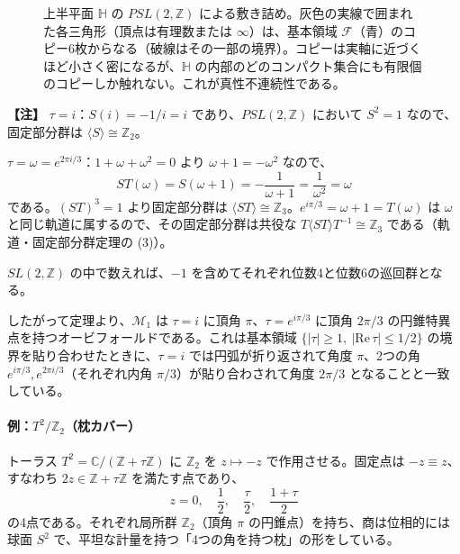 \documentclass[uplatex, dvipdfmx, book]{jsbook}
\newenvironment{note}{\vspace{1ex}\par\footnotesize\noindent\textbf{【注】}}{\par\vspace{1ex}}
\begin{document}
\begin{figure}[htbp]
\caption{上半平面 $\mathbb{H}$ の $PSL(2,\mathbb{Z})$ による敷き詰め。灰色の実線で囲まれた各三角形（頂点は有理数または $\infty$）は、基本領域 $\mathcal{F}$（青）のコピー6枚からなる（破線はその一部の境界）。コピーは実軸に近づくほど小さく密になるが、$\mathbb{H}$ の内部のどのコンパクト集合にも有限個のコピーしか触れない。これが真性不連続性である。}
\label{fig:tessellation}
\end{figure}

\begin{note}
$\tau = i$：$S(i) = -1/i = i$ であり、$PSL(2, \mathbb{Z})$ において $S^2 = 1$ なので、固定部分群は $\langle S \rangle \cong \mathbb{Z}_2$。

$\tau = \omega = e^{2\pi i/3}$：$1 + \omega + \omega^2 = 0$ より $\omega + 1 = -\omega^2$ なので、
\begin{equation*}
    ST(\omega) = S(\omega + 1) = -\frac{1}{\omega + 1} = \frac{1}{\omega^2} = \omega
\end{equation*}
である。$(ST)^3 = 1$ より固定部分群は $\langle ST \rangle \cong \mathbb{Z}_3$。$e^{i\pi/3} = \omega + 1 = T(\omega)$ は $\omega$ と同じ軌道に属するので、その固定部分群は共役な $T \langle ST \rangle T^{-1} \cong \mathbb{Z}_3$ である（軌道・固定部分群定理の (3)）。

$SL(2, \mathbb{Z})$ の中で数えれば、$-1$ を含めてそれぞれ位数4と位数6の巡回群となる。
\end{note}

したがって定理より、$\mathcal{M}_1$ は $\tau = i$ に頂角 $\pi$、$\tau = e^{i\pi/3}$ に頂角 $2\pi/3$ の円錐特異点を持つオービフォールドである。これは基本領域 $\{|\tau| \ge 1,\ |\mathrm{Re}\,\tau| \le 1/2\}$ の境界を貼り合わせたときに、$\tau = i$ では円弧が折り返されて角度 $\pi$、2つの角 $e^{i\pi/3}, e^{2\pi i/3}$（それぞれ内角 $\pi/3$）が貼り合わされて角度 $2\pi/3$ となることと一致している。

\paragraph{例：$T^2/\mathbb{Z}_2$（枕カバー）}
トーラス $T^2 = \mathbb{C}/(\mathbb{Z} + \tau\mathbb{Z})$ に $\mathbb{Z}_2$ を $z \mapsto -z$ で作用させる。固定点は $-z \equiv z$、すなわち $2z \in \mathbb{Z} + \tau\mathbb{Z}$ を満たす点であり、
\begin{equation}
    z = 0,\quad \frac{1}{2},\quad \frac{\tau}{2},\quad \frac{1 + \tau}{2}
\end{equation}
の4点である。それぞれ局所群 $\mathbb{Z}_2$（頂角 $\pi$ の円錐点）を持ち、商は位相的には球面 $S^2$ で、平坦な計量を持つ「4つの角を持つ枕」の形をしている。
\end{document}
